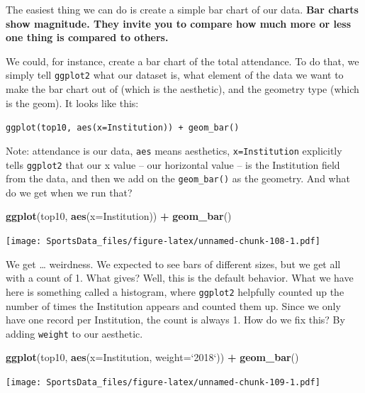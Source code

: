 \documentclass[
]{book}
\newenvironment{Shaded}{\begin{snugshade}}{\end{snugshade}}
\newcommand{\DataTypeTok}[1]{\textcolor[rgb]{0.13,0.29,0.53}{#1}}
\newcommand{\KeywordTok}[1]{\textcolor[rgb]{0.13,0.29,0.53}{\textbf{#1}}}
\newcommand{\NormalTok}[1]{#1}
\newcommand{\OperatorTok}[1]{\textcolor[rgb]{0.81,0.36,0.00}{\textbf{#1}}}
\newcommand{\StringTok}[1]{\textcolor[rgb]{0.31,0.60,0.02}{#1}}
\begin{document}
The easiest thing we can do is create a simple bar chart of our data. \textbf{Bar charts show magnitude. They invite you to compare how much more or less one thing is compared to others.}

We could, for instance, create a bar chart of the total attendance. To do that, we simply tell \texttt{ggplot2} what our dataset is, what element of the data we want to make the bar chart out of (which is the aesthetic), and the geometry type (which is the geom). It looks like this:

\texttt{ggplot(top10,\ aes(x=Institution))\ +\ geom\_bar()}

Note: attendance is our data, \texttt{aes} means aesthetics, \texttt{x=Institution} explicitly tells \texttt{ggplot2} that our x value -- our horizontal value -- is the Institution field from the data, and then we add on the \texttt{geom\_bar()} as the geometry. And what do we get when we run that?

\begin{Shaded}
\begin{Highlighting}[]
\KeywordTok{ggplot}\NormalTok{(top10, }\KeywordTok{aes}\NormalTok{(}\DataTypeTok{x=}\NormalTok{Institution)) }\OperatorTok{+}\StringTok{ }\KeywordTok{geom_bar}\NormalTok{()}
\end{Highlighting}
\end{Shaded}

\texttt{[image: SportsData\_files/figure-latex/unnamed-chunk-108-1.pdf]}

We get \ldots{} weirdness. We expected to see bars of different sizes, but we get all with a count of 1. What gives? Well, this is the default behavior. What we have here is something called a histogram, where \texttt{ggplot2} helpfully counted up the number of times the Institution appears and counted them up. Since we only have one record per Institution, the count is always 1. How do we fix this? By adding \texttt{weight} to our aesthetic.

\begin{Shaded}
\begin{Highlighting}[]
\KeywordTok{ggplot}\NormalTok{(top10, }\KeywordTok{aes}\NormalTok{(}\DataTypeTok{x=}\NormalTok{Institution, }\DataTypeTok{weight=}\StringTok{`}\DataTypeTok{2018}\StringTok{`}\NormalTok{)) }\OperatorTok{+}\StringTok{ }
\StringTok{  }\KeywordTok{geom_bar}\NormalTok{()}
\end{Highlighting}
\end{Shaded}

\texttt{[image: SportsData\_files/figure-latex/unnamed-chunk-109-1.pdf]}
\end{document}
